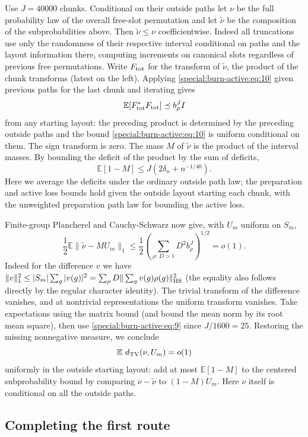 Use \(J=40000\) chunks. Conditional on their outside paths let \(\nu\) be the full probability law of the overall free-slot permutation and let \(\widetilde\nu\) be the composition of the subprobabilities above. Then \(\widetilde\nu\le\nu\) coefficientwise. Indeed all truncations use only the randomness of their respective interval conditional on paths and the layout information there, computing increments on canonical slots regardless of previous free permutations. Write \(F_{\rm tot}\) for the transform of \(\widetilde\nu\), the product of the chunk transforms (latest on the left). Applying \eqref{special:burn-active:eq:10} given previous paths for the last chunk and iterating gives
\[
 \mathbb E[F_{\rm tot}^*F_{\rm tot}]\preceq b_\rho^J I
\]
from any starting layout: the preceding product is determined by the preceding outside paths and the bound \eqref{special:burn-active:eq:10} is uniform conditional on them. The sign transform is zero. The mass \(M\) of \(\widetilde\nu\) is the product of the interval masses. By bounding the deficit of the product by the sum of deficits,
\[
 \mathbb E[1-M]\le J(2\delta_n+n^{-1/40}).
\]
Here we average the deficits under the ordinary outside path law; the preparation and active loss bounds hold given the outside layout starting each chunk, with the unweighted preparation path law for bounding the active loss.

Finite-group Plancherel and Cauchy-Schwarz now give, with \(U_m\) uniform on \(S_m\),
\[
 \frac12\mathbb E\|\widetilde\nu-MU_m\|_1
 \le \frac12\left(\sum_{\rho:\,D>1}D^2 b_\rho^J\right)^{1/2}=o(1).
\]
Indeed for the difference \(v\) we have \(\|v\|_1^2\le |S_m|\sum_g |v(g)|^2=\sum_\rho D\|\sum_g v(g)\rho(g)\|_{\rm HS}^2\) (the equality also follows directly by the regular character identity). The trivial transform of the difference vanishes, and at nontrivial representations the uniform transform vanishes. Take expectations using the matrix bound (and bound the mean norm by its root mean square), then use \eqref{special:burn-active:eq:9} since \(J/1600=25\). Restoring the missing nonnegative measure, we conclude
\begin{equation}
 \mathbb E\ d_{\rm TV}(\nu,U_m)=o(1) \label{special:burn-active:eq:11}
\end{equation}
uniformly in the outside starting layout: add at most \(\mathbb E[1-M]\) to the centered subprobability bound by comparing \(\nu-\widetilde\nu\) to \((1-M)U_m\). Here \(\nu\) itself is conditional on all the outside paths.

\subsection{Completing the first route}\label{sec:burn-completion}

